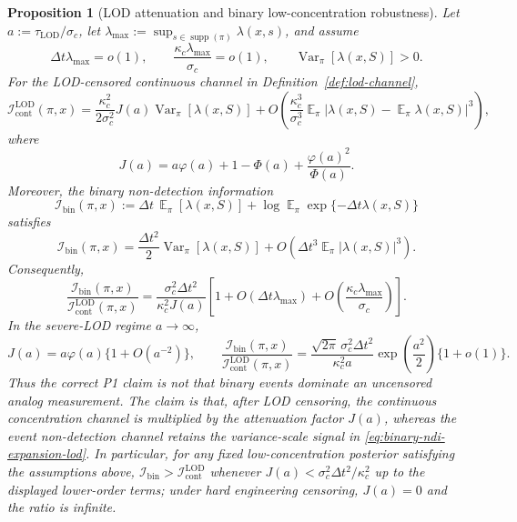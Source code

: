 \documentclass[11pt]{article}
\newtheorem{proposition}[theorem]{Proposition}
\DeclareMathOperator{\E}{\mathbb{E}}
\DeclareMathOperator{\Var}{\mathrm{Var}}
\DeclareMathOperator{\supp}{\mathrm{supp}}
\newcommand{\dt}{\Delta t}
\newcommand{\Ibin}{\mathcal{I}_{\mathrm{bin}}}
\newcommand{\Ilod}{\mathcal{I}_{\mathrm{cont}}^{\mathrm{LOD}}}
\newcommand{\ph}{\varphi}
\newcommand{\Ph}{\Phi}
\begin{document}
\begin{proposition}[LOD attenuation and binary low-concentration robustness]\label{prop:p1-lod}
Let $a:=\tau_{\mathrm{LOD}}/\sigma_c$, let $\lambda_{\max}:=\sup_{s\in\supp(\pi)}\lambda(x,s)$, and assume
\[
        \dt\lambda_{\max}=o(1),
        \qquad
        \frac{\kappa_c\lambda_{\max}}{\sigma_c}=o(1),
        \qquad
        \Var_{\pi}[\lambda(x,S)]>0 .
\]
For the LOD-censored continuous channel in Definition~\ref{def:lod-channel},
\begin{equation}
        \Ilod(\pi,x)
        =
        \frac{\kappa_c^2}{2\sigma_c^2}
        J(a)\Var_{\pi}[\lambda(x,S)]
        +
        O\!\left(
        \frac{\kappa_c^3}{\sigma_c^3}
        \E_{\pi}|\lambda(x,S)-\E_{\pi}\lambda(x,S)|^3
        \right),
        \label{eq:lod-information-expansion}
\end{equation}
where
\begin{equation}
        J(a)
        =
        a\ph(a)+1-\Ph(a)+\frac{\ph(a)^2}{\Ph(a)} .
        \label{eq:lod-attenuation-factor}
\end{equation}
Moreover, the binary non-detection information
\[
        \Ibin(\pi,x)
        :=
        \dt\,\E_{\pi}[\lambda(x,S)]
        +
        \log\E_{\pi}\exp\{-\dt\lambda(x,S)\}
\]
satisfies
\begin{equation}
        \Ibin(\pi,x)
        =
        \frac{\dt^2}{2}\Var_{\pi}[\lambda(x,S)]
        +
        O\!\left(\dt^3\E_{\pi}|\lambda(x,S)|^3\right).
        \label{eq:binary-ndi-expansion-lod}
\end{equation}
Consequently,
\begin{equation}
        \frac{\Ibin(\pi,x)}{\Ilod(\pi,x)}
        =
        \frac{\sigma_c^2\dt^2}{\kappa_c^2J(a)}
        \left[
        1+O(\dt\lambda_{\max})
          +O\!\left(\frac{\kappa_c\lambda_{\max}}{\sigma_c}\right)
        \right].
        \label{eq:lod-ratio}
\end{equation}
In the severe-LOD regime $a\to\infty$,
\begin{equation}
        J(a)
        =
        a\ph(a)\{1+O(a^{-2})\},
        \qquad
        \frac{\Ibin(\pi,x)}{\Ilod(\pi,x)}
        =
        \frac{\sqrt{2\pi}\,\sigma_c^2\dt^2}{\kappa_c^2a}
        \exp\!\left(\frac{a^2}{2}\right)
        \{1+o(1)\}.
        \label{eq:lod-severe-asymptotic}
\end{equation}
Thus the correct P1 claim is not that binary events dominate an uncensored analog measurement.  The claim is that, after LOD censoring, the continuous concentration channel is multiplied by the attenuation factor $J(a)$, whereas the event non-detection channel retains the variance-scale signal in \eqref{eq:binary-ndi-expansion-lod}.  In particular, for any fixed low-concentration posterior satisfying the assumptions above, $\Ibin>\Ilod$ whenever $J(a)<\sigma_c^2\dt^2/\kappa_c^2$ up to the displayed lower-order terms; under hard engineering censoring, $J(a)=0$ and the ratio is infinite.
\end{proposition}
\end{document}
